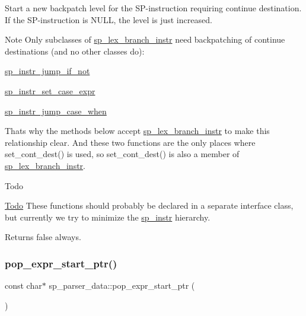 Start a new backpatch level for the SP-\/instruction requiring continue destination. If the SP-\/instruction is N\+U\+LL, the level is just increased.

\begin{DoxyNote}{Note}
Only subclasses of \mbox{\hyperlink{classsp__lex__branch__instr}{sp\+\_\+lex\+\_\+branch\+\_\+instr}} need backpatching of continue destinations (and no other classes do)\+:
\begin{DoxyItemize}
\item \mbox{\hyperlink{classsp__instr__jump__if__not}{sp\+\_\+instr\+\_\+jump\+\_\+if\+\_\+not}}
\item \mbox{\hyperlink{classsp__instr__set__case__expr}{sp\+\_\+instr\+\_\+set\+\_\+case\+\_\+expr}}
\item \mbox{\hyperlink{classsp__instr__jump__case__when}{sp\+\_\+instr\+\_\+jump\+\_\+case\+\_\+when}}
\end{DoxyItemize}
\end{DoxyNote}
That\textquotesingle{}s why the methods below accept \mbox{\hyperlink{classsp__lex__branch__instr}{sp\+\_\+lex\+\_\+branch\+\_\+instr}} to make this relationship clear. And these two functions are the only places where set\+\_\+cont\+\_\+dest() is used, so set\+\_\+cont\+\_\+dest() is also a member of \mbox{\hyperlink{classsp__lex__branch__instr}{sp\+\_\+lex\+\_\+branch\+\_\+instr}}.

\begin{DoxyRefDesc}{Todo}
\item[\mbox{\hyperlink{todo__todo000067}{Todo}}]These functions should probably be declared in a separate interface class, but currently we try to minimize the \mbox{\hyperlink{classsp__instr}{sp\+\_\+instr}} hierarchy.\end{DoxyRefDesc}


\begin{DoxyReturn}{Returns}
false always. 
\end{DoxyReturn}
\mbox{\label{classsp__parser__data_a4665278dcaa28b14d1f3d4ae88694f66}} 
\subsubsection{\texorpdfstring{pop\+\_\+expr\+\_\+start\+\_\+ptr()}{pop\_expr\_start\_ptr()}}
{\footnotesize\ttfamily const char$\ast$ sp\+\_\+parser\+\_\+data\+::pop\+\_\+expr\+\_\+start\+\_\+ptr (\begin{DoxyParamCaption}{ }\end{DoxyParamCaption})\hspace{0.3cm}{\ttfamily [inline]}}

